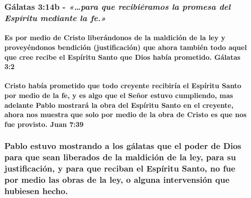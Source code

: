 \documentclass[11a pt,twoside]{article}
\newcommand{\scripture}[1]{%
  {\fontsize{12pt}{16pt}\selectfont\ScriptureFont\itshape #1}%
}
\let\oldsubsubsection\subsubsection
\renewcommand{\subsubsection}{\needspace{4\baselineskip}\oldsubsubsection}
\let\oldparagraph\paragraph
\renewcommand{\paragraph}{\needspace{3\baselineskip}\oldparagraph}
\begin{document}
\subsubsection{\texorpdfstring{Gálatas 3:14b -
\scripture{«…para que recibiéramos la promesa del Espíritu mediante la fe.»}}{Gálatas 3:14b - }}\label{guxe1latas-314b---para-que-recibiuxe9ramos-la-promesa-del-espuxedritu-mediante-la-fe.}

\paragraph{Es por medio de Cristo liberándonos de la maldición de la ley
y proveyéndonos bendición (justificación) que ahora también todo aquel
que cree recibe el Espíritu Santo que Dios había prometido. Gálatas
3:2}\label{es-por-medio-de-cristo-liberuxe1ndonos-de-la-maldiciuxf3n-de-la-ley-y-proveyuxe9ndonos-bendiciuxf3n-justificaciuxf3n-que-ahora-tambiuxe9n-todo-aquel-que-cree-recibe-el-espuxedritu-santo-que-dios-habuxeda-prometido.-guxe1latas-32}

\paragraph{Cristo había prometido que todo creyente recibiría el
Espíritu Santo por medio de la fe, y es algo que el Señor estuvo
cumpliendo, mas adelante Pablo mostrará la obra del Espíritu Santo en el
creyente, ahora nos muestra que solo por medio de la obra de Cristo es
que nos fue provisto. Juan
7:39}\label{cristo-habuxeda-prometido-que-todo-creyente-recibiruxeda-el-espuxedritu-santo-por-medio-de-la-fe-y-es-algo-que-el-seuxf1or-estuvo-cumpliendo-mas-adelante-pablo-mostraruxe1-la-obra-del-espuxedritu-santo-en-el-creyente-ahora-nos-muestra-que-solo-por-medio-de-la-obra-de-cristo-es-que-nos-fue-provisto.-juan-739}

\subsubsection{Pablo estuvo mostrando a los gálatas que el poder de Dios
para que sean liberados de la maldición de la ley, para su
justificación, y para que reciban el Espíritu Santo, no fue por medio
las obras de la ley, o alguna intervensión que hubiesen
hecho.}\label{pablo-estuvo-mostrando-a-los-guxe1latas-que-el-poder-de-dios-para-que-sean-liberados-de-la-maldiciuxf3n-de-la-ley-para-su-justificaciuxf3n-y-para-que-reciban-el-espuxedritu-santo-no-fue-por-medio-las-obras-de-la-ley-o-alguna-intervensiuxf3n-que-hubiesen-hecho.}
\end{document}
